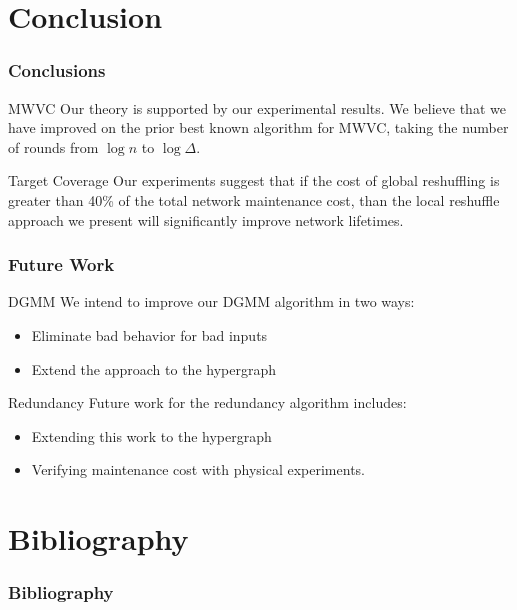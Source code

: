 \section{Conclusion}
\begin{frame}
	\frametitle{Conclusions}
	\begin{block}{MWVC}
	Our theory is supported by our experimental results. We believe that we have improved on the prior best known algorithm for MWVC, taking the number of rounds from $\log n$ to $\log \Delta$.
	\end{block}
	\begin{block}{Target Coverage}
	Our experiments suggest that if the cost of global reshuffling is greater than 40\% of the total network maintenance cost, than the local reshuffle approach we present will significantly improve network lifetimes.
	\end{block}
\end{frame}
\begin{frame}
	\frametitle{Future Work}
	\begin{block}{DGMM}
	We intend to improve our DGMM algorithm in two ways:
	\begin{itemize}
	\item Eliminate bad behavior for bad inputs
	\item Extend the approach to the hypergraph
	\end{itemize}
	\end{block}
	\begin{block}{Redundancy}
	Future work for the redundancy algorithm includes:
	\begin{itemize}
	\item Extending this work to the hypergraph
	\item Verifying maintenance cost with physical experiments.
	\end{itemize}
\end{block}
	\end{frame}
\section{Bibliography}
\begin{frame}[allowframebreaks]
\frametitle{Bibliography}
	
\end{frame}

